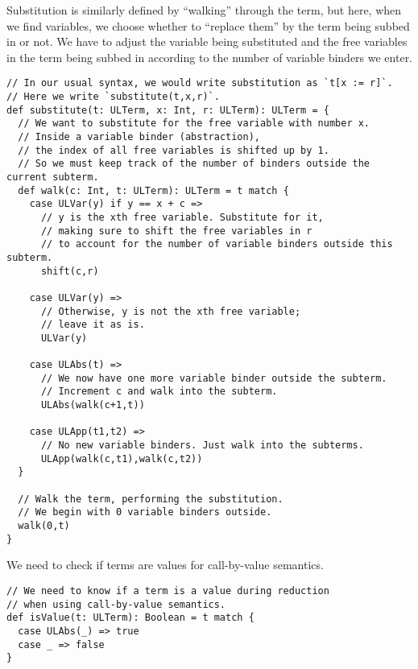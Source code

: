 \documentclass[11pt]{article}
\begin{document}
Substitution is similarly defined by “walking” through the term,
but here, when we find variables, we choose whether to “replace them”
by the term being subbed in or not.
We have to adjust the variable being substituted and the
free variables in the term being subbed in according to
the number of variable binders we enter.
\begin{verbatim}
// In our usual syntax, we would write substitution as `t[x := r]`.
// Here we write `substitute(t,x,r)`.
def substitute(t: ULTerm, x: Int, r: ULTerm): ULTerm = {
  // We want to substitute for the free variable with number x.
  // Inside a variable binder (abstraction),
  // the index of all free variables is shifted up by 1.
  // So we must keep track of the number of binders outside the current subterm.
  def walk(c: Int, t: ULTerm): ULTerm = t match {
    case ULVar(y) if y == x + c =>
      // y is the xth free variable. Substitute for it,
      // making sure to shift the free variables in r
      // to account for the number of variable binders outside this subterm.
      shift(c,r)
    
    case ULVar(y) =>
      // Otherwise, y is not the xth free variable;
      // leave it as is.
      ULVar(y)
    
    case ULAbs(t) =>
      // We now have one more variable binder outside the subterm.
      // Increment c and walk into the subterm.
      ULAbs(walk(c+1,t))

    case ULApp(t1,t2) =>
      // No new variable binders. Just walk into the subterms.
      ULApp(walk(c,t1),walk(c,t2))
  }

  // Walk the term, performing the substitution.
  // We begin with 0 variable binders outside.
  walk(0,t)
}
\end{verbatim}

We need to check if terms are values for call-by-value semantics.
\begin{verbatim}
// We need to know if a term is a value during reduction
// when using call-by-value semantics.
def isValue(t: ULTerm): Boolean = t match {
  case ULAbs(_) => true
  case _ => false
}
\end{verbatim}
\end{document}
